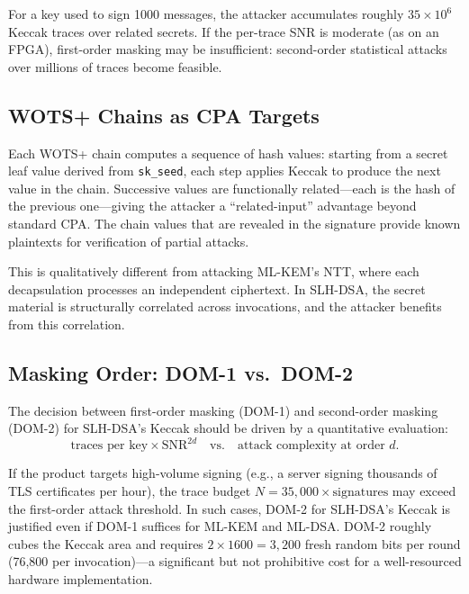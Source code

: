 For a key used to sign 1000 messages, the attacker accumulates roughly $35 \times 10^6$ Keccak traces over related secrets.  If the per-trace SNR is moderate (as on an FPGA), first-order masking may be insufficient: second-order statistical attacks over millions of traces become feasible.

\subsection{WOTS+ Chains as CPA Targets}
\label{subsec:wots-cpa}

Each WOTS+ chain computes a sequence of hash values: starting from a secret leaf value derived from \texttt{sk\_seed}, each step applies Keccak to produce the next value in the chain.  Successive values are functionally related---each is the hash of the previous one---giving the attacker a ``related-input'' advantage beyond standard CPA.  The chain values that are revealed in the signature provide known plaintexts for verification of partial attacks.

This is qualitatively different from attacking ML-KEM's NTT, where each decapsulation processes an independent ciphertext.  In SLH-DSA, the secret material is structurally correlated across invocations, and the attacker benefits from this correlation.

\subsection{Masking Order: DOM-1 vs.\ DOM-2}
\label{subsec:masking-order}

The decision between first-order masking (DOM-1) and second-order masking (DOM-2) for SLH-DSA's Keccak should be driven by a quantitative evaluation:
\begin{equation}
\label{eq:masking-order-criterion}
\text{traces per key} \times \text{SNR}^{2d} \quad\text{vs.}\quad \text{attack complexity at order } d.
\end{equation}

If the product targets high-volume signing (e.g., a server signing thousands of TLS certificates per hour), the trace budget $N = 35{,}000 \times \text{signatures}$ may exceed the first-order attack threshold.  In such cases, DOM-2 for SLH-DSA's Keccak is justified even if DOM-1 suffices for ML-KEM and ML-DSA.  DOM-2 roughly cubes the Keccak area and requires $2 \times 1600 = 3{,}200$ fresh random bits per round (76,800 per invocation)---a significant but not prohibitive cost for a well-resourced hardware implementation.

